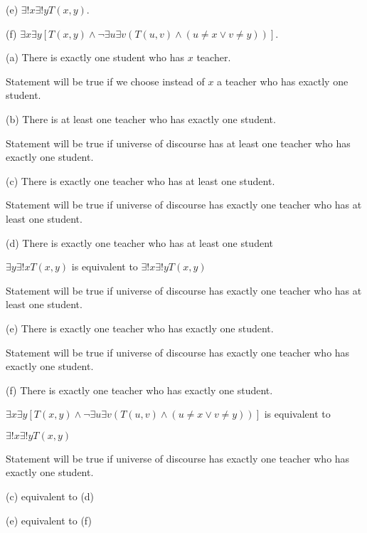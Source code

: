 \documentclass{article}
\begin{document}
\hspace{12pt}(e) $\exists ! x \exists ! y T(x, y)$.

\hspace{12pt}(f) $\exists x \exists y [T (x, y) \land \neg \exists u \exists v (T(u, v) \land (u \neq  x \lor v \neq y))]$.
\vspace{20pt}

(a) There is exactly one student who has $x$ teacher.

Statement will be true if we choose instead of $x$ a teacher who has exactly one student.
\vspace{20pt}

(b) There is at least one teacher who has exactly one student.

Statement will be true if universe of discourse has at least one teacher who has exactly one student.
\vspace{20pt}

(c) There is exactly one teacher who has at least one student.

Statement will be true if universe of discourse has exactly one teacher who has at least one student.
\vspace{20pt}

(d) There is exactly one teacher who has at least one student

$\exists y \exists ! x T(x, y)$ is equivalent to $\exists ! x \exists ! y T(x, y)$

Statement will be true if universe of discourse has exactly one teacher who has at least one student.
\vspace{20pt}

(e) There is exactly one teacher who has exactly one student.

Statement will be true if universe of discourse has exactly one teacher who has exactly one student.
\vspace{20pt}

(f) There is exactly one teacher who has exactly one student.

$\exists x \exists y [T (x, y) \land \neg \exists u \exists v (T(u, v) \land (u \neq  x \lor v \neq y))]$ is equivalent to

$\exists ! x \exists ! y T(x, y)$

Statement will be true if universe of discourse has exactly one teacher who has exactly one student.
\vspace{20pt}


(c) equivalent to (d)

(e) equivalent to (f)
\end{document}
